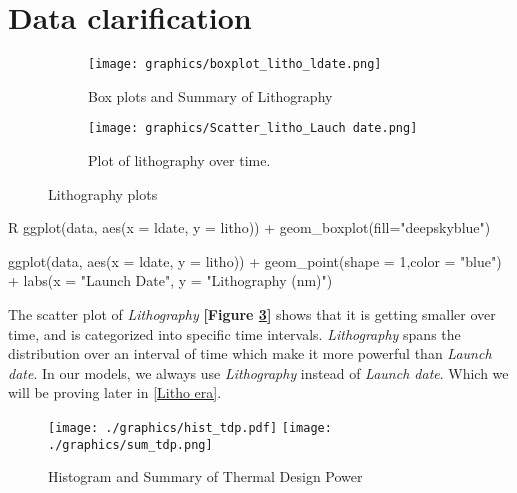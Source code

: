 %
%   
\section{Data clarification}
\label{section:data_clarify}

\begin{figure}[H]
    \centering
    \begin{subfigure}[b]{0.49\textwidth}
        \texttt{[image: graphics/boxplot\_litho\_ldate.png]}
        \caption{Box plots and Summary of Lithography}
        \label{fig:box_litho}
    \end{subfigure}
    \hfill
    \begin{subfigure}[b]{0.49\textwidth}
        \texttt{[image: graphics/Scatter\_litho\_Lauch date.png]}
        \caption{Plot of lithography over time.}
        \label{fig:scatter_litho}
    \end{subfigure}
    \caption{Lithography plots}
    \label{litho-ldate}
\end{figure}

\begin{code}{R}
ggplot(data, aes(x = ldate, y = litho)) +
  geom_boxplot(fill="deepskyblue")
    
ggplot(data, aes(x = ldate, y = litho)) +
    geom_point(shape = 1,color = "blue") +
    labs(x = "Launch Date", y = "Lithography (nm)")
\end{code}

The scatter plot of \textit{Lithography} \textbf{[Figure \ref{litho-ldate}]} 
shows that it is getting smaller over time, and is categorized into specific time intervals.
\textit{Lithography} spans the distribution over an interval of time which make it more powerful than \textit{Launch date}. In our
models, we always use \textit{Lithography} instead of \textit{Launch date}. Which we will be proving later in \ref{Litho era}.









\begin{figure}[H]
    \centering
    \texttt{[image: ./graphics/hist\_tdp.pdf]}
    \texttt{[image: ./graphics/sum\_tdp.png]}
    \caption{Histogram and Summary of Thermal Design Power}
    \label{fig:hist_tdp}
\end{figure}


